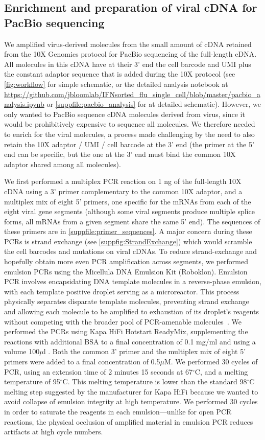 \documentclass[10pt,letterpaper]{article}
\newcommand{\FIG}[1]{\autoref{fig:#1}}
\newcommand{\SUPPFILE}[1]{\autoref{suppfile:#1}}
\newcommand{\SUPPFIG}[1]{\autoref{suppfig:#1}}
\begin{document}
\subsection*{Enrichment and preparation of viral cDNA for PacBio sequencing}
We amplified virus-derived molecules from the small amount of cDNA retained from the 10X Genomics protocol for PacBio sequencing of the full-length cDNA.
All molecules in this cDNA have at their 3' end the cell barcode and UMI plus the constant adaptor sequence that is added during the 10X protocol (see \FIG{workflow} for simple schematic, or the detailed analysis notebook at \url{https://github.com/jbloomlab/IFNsorted_flu_single_cell/blob/master/pacbio_analysis.ipynb} or \SUPPFILE{pacbio_analysis} for at detailed schematic).
However, we only wanted to PacBio sequence cDNA molecules derived from virus, since it would be prohibitively expensive to sequence all molecules.
We therefore needed to enrich for the viral molecules, a process made challenging by the need to also retain the 10X adaptor / UMI / cell barcode at the 3' end (the primer at the 5' end can be specific, but the one at the 3' end must bind the common 10X adaptor shared among all molecules).

We first performed a multiplex PCR reaction on 1 ng of the full-length 10X cDNA using a 3' primer complementary to the common 10X adaptor, and a multiplex mix of eight 5' primers, one specific for the mRNAs from each of the eight viral gene segments (although some viral segments produce multiple splice forms, all mRNAs from a given segment share the same 5' end).
The sequences of these primers are in \SUPPFILE{primer_sequences}.
A major concern during these PCRs is strand exchange (see \SUPPFIG{StrandExchange}) which would scramble the cell barcodes and mutations on viral cDNAs.
To reduce strand-exchange and hopefully obtain more even PCR amplification across segments, we performed emulsion PCRs using the Micellula DNA Emulsion Kit (Roboklon).
Emulsion PCR involves encapsidating DNA template molecules in a reverse-phase emulsion, with each template positive droplet serving as a microreactor.
This process physically separates disparate template molecules, preventing strand exchange and allowing each molecule to be amplified to exhaustion of its droplet's reagents without competing with the broader pool of PCR-amenable molecules~\cite{Boers:2015emulsion}.
We performed the PCRs using Kapa HiFi Hotstart ReadyMix, supplementing the reactions with additional BSA to a final concentration of 0.1 mg/ml and using a volume 100$\mu$l .
Both the common 3' primer and the multiplex mix of eight 5' primers were added to a final concentration of 0.5$\mu$M.
We performed 30 cycles of PCR, using an extension time of 2 minutes 15 seconds at 67$^{\circ}$C, and a melting temperature of 95$^{\circ}$C.
This melting temperature is lower than the standard 98$^{\circ}$C melting step suggested by the manufacturer for Kapa HiFi because we wanted to avoid collapse of emulsion integrity at high temperature.
We performed 30 cycles in order to saturate the reagents in each emulsion---unlike for open PCR reactions, the physical occlusion of amplified material in emulsion PCR reduces artifacts at high cycle numbers.
\end{document}
